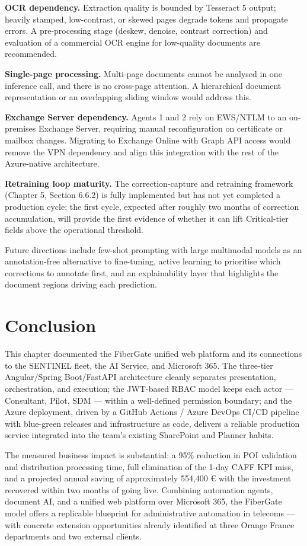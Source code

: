 \textbf{OCR dependency.} Extraction quality is bounded by Tesseract 5 output; heavily stamped, low-contrast, or skewed pages degrade tokens and propagate errors. A pre-processing stage (deskew, denoise, contrast correction) and evaluation of a commercial OCR engine for low-quality documents are recommended.

\textbf{Single-page processing.} Multi-page documents cannot be analysed in one inference call, and there is no cross-page attention. A hierarchical document representation or an overlapping sliding window would address this.

\textbf{Exchange Server dependency.} Agents 1 and 2 rely on EWS/NTLM to an on-premises Exchange Server, requiring manual reconfiguration on certificate or mailbox changes. Migrating to Exchange Online with Graph API access would remove the VPN dependency and align this integration with the rest of the Azure-native architecture.

\textbf{Retraining loop maturity.} The correction-capture and retraining framework (Chapter 5, Section 6.6.2) is fully implemented but has not yet completed a production cycle; the first cycle, expected after roughly two months of correction accumulation, will provide the first evidence of whether it can lift Critical-tier fields above the operational threshold.

Future directions include few-shot prompting with large multimodal models as an annotation-free alternative to fine-tuning, active learning to prioritise which corrections to annotate first, and an explainability layer that highlights the document regions driving each prediction.

\section*{Conclusion}

This chapter documented the FiberGate unified web platform and its connections to the SENTINEL fleet, the AI Service, and Microsoft 365. The three-tier Angular/Spring Boot/FastAPI architecture cleanly separates presentation, orchestration, and execution; the JWT-based RBAC model keeps each actor — Consultant, Pilot, SDM — within a well-defined permission boundary; and the Azure deployment, driven by a GitHub Actions / Azure DevOps CI/CD pipeline with blue-green releases and infrastructure as code, delivers a reliable production service integrated into the team's existing SharePoint and Planner habits.

The measured business impact is substantial: a 95\% reduction in POI validation and distribution processing time, full elimination of the 1-day CAFF KPI miss, and a projected annual saving of approximately 554,400 € with the investment recovered within two months of going live. Combining automation agents, document AI, and a unified web platform over Microsoft 365, the FiberGate model offers a replicable blueprint for administrative automation in telecoms — with concrete extension opportunities already identified at three Orange France departments and two external clients.
